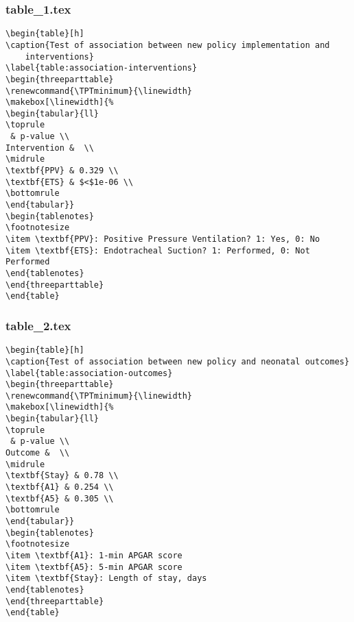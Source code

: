 \documentclass[11pt]{article}
\begin{document}
\subsubsection*{table\_1.tex}

\begin{Verbatim}[tabsize=4]
\begin{table}[h]
\caption{Test of association between new policy implementation and
	interventions}
\label{table:association-interventions}
\begin{threeparttable}
\renewcommand{\TPTminimum}{\linewidth}
\makebox[\linewidth]{%
\begin{tabular}{ll}
\toprule
 & p-value \\
Intervention &  \\
\midrule
\textbf{PPV} & 0.329 \\
\textbf{ETS} & $<$1e-06 \\
\bottomrule
\end{tabular}}
\begin{tablenotes}
\footnotesize
\item \textbf{PPV}: Positive Pressure Ventilation? 1: Yes, 0: No
\item \textbf{ETS}: Endotracheal Suction? 1: Performed, 0: Not Performed
\end{tablenotes}
\end{threeparttable}
\end{table}

\end{Verbatim}

\subsubsection*{table\_2.tex}

\begin{Verbatim}[tabsize=4]
\begin{table}[h]
\caption{Test of association between new policy and neonatal outcomes}
\label{table:association-outcomes}
\begin{threeparttable}
\renewcommand{\TPTminimum}{\linewidth}
\makebox[\linewidth]{%
\begin{tabular}{ll}
\toprule
 & p-value \\
Outcome &  \\
\midrule
\textbf{Stay} & 0.78 \\
\textbf{A1} & 0.254 \\
\textbf{A5} & 0.305 \\
\bottomrule
\end{tabular}}
\begin{tablenotes}
\footnotesize
\item \textbf{A1}: 1-min APGAR score
\item \textbf{A5}: 5-min APGAR score
\item \textbf{Stay}: Length of stay, days
\end{tablenotes}
\end{threeparttable}
\end{table}

\end{Verbatim}




\end{document}
